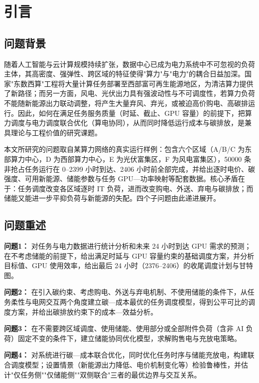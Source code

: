 \section{引言}
\subsection{问题背景}

随着人工智能与云计算规模持续扩张，数据中心已成为电力系统中不可忽视的负荷主体，其高密度、强弹性、跨区域的特征使得"算力"与"电力"的耦合日益加深。国家"东数西算"工程将大量计算任务部署至西部富可再生能源地区，为清洁算力提供了新路径；而另一方面，风电、光伏出力具有强波动性与不可调度性，若算力负荷不能随新能源出力联动调整，将产生大量弃风、弃光，或被迫高价购电、高碳排运行。因此，如何在满足任务服务质量（时延、截止、GPU 容量）的前提下，把算力调度与电力调度联合优化（算电协同），从而同时降低运行成本与碳排放，是兼具理论与工程价值的研究课题。

本文所研究的问题取自某算力网络的真实运行样例：包含六个区域（A/B/C 为东部算力中心，D 为西部算力中心，E 为光伏富集区，F 为风电富集区），50000 条非抢占任务运行在 0--2399 小时到达、2406 小时前全部完成，并给出逐时电价、碳强度、可用新能源、储能参数与任务 GPU—功率映射等配套数据。核心矛盾在于：任务调度改变各区域逐时 IT 负荷，进而改变购电、外送、弃电与碳排放；而储能又能进一步平抑负荷与新能源的失配。四个子问题由此递进展开。

\subsection{问题重述}

\textbf{问题1：} 对任务与电力数据进行统计分析和未来 24 小时到达 GPU 需求的预测；在不考虑储能的前提下，给出满足时延与 GPU 容量约束的基础调度方案，并分析目标值、GPU 使用效率，给出最后 24 小时（2376--2406）的收尾调度计划与甘特图。

\textbf{问题2：} 在引入碳约束、考虑购电、外送与弃电机制、不使用储能的条件下，从任务柔性与电网交互两个角度建立碳—成本最优的任务调度模型，得到公平可比的调度方案，并给出碳排放约束下的成本—效益分析。

\textbf{问题3：} 在不需要跨区域调度、使用储能、使用部分或全部附件负荷（含非 AI 负荷）固定不变的条件下，建立储能协同优化模型，求解购售电与充放电策略。

\textbf{问题4：} 对系统进行碳—成本联合优化，同时优化任务时序与储能充放电，构建联合调度模型；设置情景（新能源出力降低、电价机制变化等）检验鲁棒性，并估计"仅任务侧""仅储能侧""双侧联合"三者的最优边界与交互关系。
